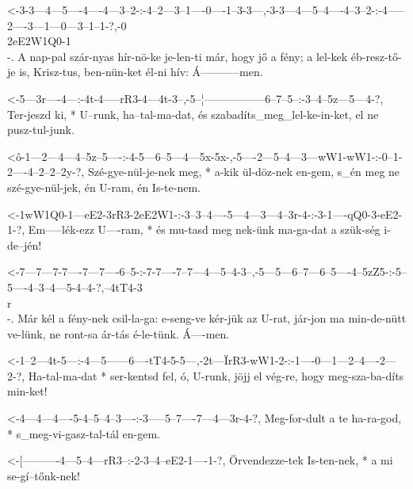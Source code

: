   {<-3-3---4---5----4----4---3--2-:-4--2---3--1----0----1--3-3---,-3-3---4---5--4----4--3--2-:-4-----2----3---1---0---3--1--1-?,-0\\2eE2W1Q0-1\\-.}
  {  A nap-pal szár-nyas hír-nö-ke  je-len-ti már, hogy jő a fény; a lel-kek éb-resz-tő-je is, Krisz-tus, ben-nün-ket él-ni hív: Á-----------men.}

  {<-5---3r----4---:-4t-4-----rR3-4---4t-3--,-5--¦-----------------6--7--5--:-3--4--5z---5---4-?,}
  {  Ter-jeszd ki, * U--runk, ha--tal-ma-dat, és szabadíts_meg_lel-ke-in-ket, el ne pusz-tul-junk.}

  {<ô-1---2---4---4--5z--5----:-4-5---6--5---4---5x-5x-,-5----2---5--4---3---wW1-wW1-:-0--1-2----4--2--2--2y-?,}
  {   Szé-gye-nül-je-nek meg, * a-kik ül-döz-nek en-gem, s_én meg ne szé-gye-nül-jek,  én U-ram, én Is-te-nem.}

  {<-1wW1Q0-1---eE2-3rR3-2eE2W1-:-3--3--4----5---4---3---4--3r-4-:-3-1----qQ0-3-eE2-1-?,}
  {  Em-----lék-ezz U----ram,   * és mu-tasd meg nek-ünk ma-ga-dat a szük-ség i-de--jén!}


  {<-7---7---7-7----7---7----6--5-:-7-7----7--7---4---5--4-3--,-5---5---6--7---6--5----4--5zZ5-:-5--5----4--3--4---5-4--4-?,--4tT4-3\\r\\-.}
  {  Már kél a fény-nek csil-la-ga: e-seng-ve kér-jük az U-rat, jár-jon ma min-de-nütt ve-lünk,  ne ront-sa ár-tás é-le-tünk. Á----men.}

  {<-1--2---4t-5---:-4---5------6----tT4-5-5---,-2t---ÏrR3-wW1-2-:-1----0---1---2--4----2---2-?,}
  {  Ha-tal-ma-dat * ser-kentsd fel, ó,  U-runk, jöjj el   vég-re, hogy meg-sza-ba-díts min-ket!}

  {<-4---4---4----5-4--5--4--3----:-3-----5--7----7---4---3r-4-?,}
  {  Meg-for-dult a te ha-ra-god, * s_meg-vi-gasz-tal-tál en-gem.}

  {<-[----------4---5--4---rR3--:-2-3--4--eE2-1----1-?,}
  {  Örvendezze-tek Is-ten-nek, * a mi se-gí--tőnk-nek!}

